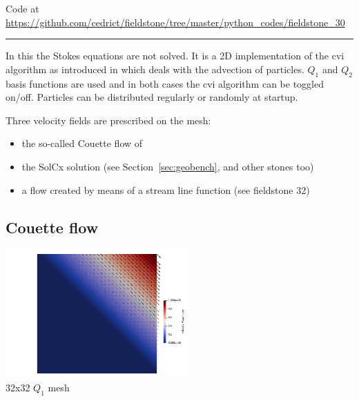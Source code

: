 


\begin{center}
Code at \url{https://github.com/cedrict/fieldstone/tree/master/python_codes/fieldstone_30}
\end{center}

\par\noindent\rule{\textwidth}{0.4pt}

In this the Stokes equations are not solved. It is a 2D implementation of the cvi algorithm 
as introduced in \cite{waav15} which deals with the advection of particles. 
$Q_1$ and $Q_2$ basis functions are used and in both cases the cvi algorithm can be toggled on/off. 
Particles can be distributed regularly or randomly at startup.

Three velocity fields are prescribed on the mesh:
\begin{itemize}
\item the so-called Couette flow of \cite{waav15} 
\item the SolCx solution (see Section~\ref{sec:geobench}, and  other stones too)
\item a flow created by means of a stream line function (see fieldstone 32)
\end{itemize}

\subsection*{Couette flow}

\begin{center}
\includegraphics[width=7cm]{python_codes/fieldstone_30/results_couette/vel}\\
{\captionfont 32x32 $Q_1$ mesh}
\end{center}

